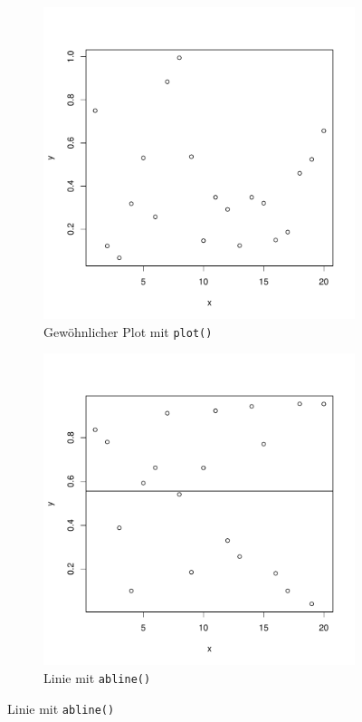 \begin{figure}[h!]
\centering
\begin{subfigure}[b]{0.48\textwidth}
\includegraphics{r-cmd-014}
\caption{Gewöhnlicher Plot mit \lstinline{plot()}}
\end{subfigure}
\begin{subfigure}[b]{0.48\textwidth}
\includegraphics{r-cmd-015}
\caption{Linie mit \lstinline{abline()}}
\end{subfigure}


\end{figure}
